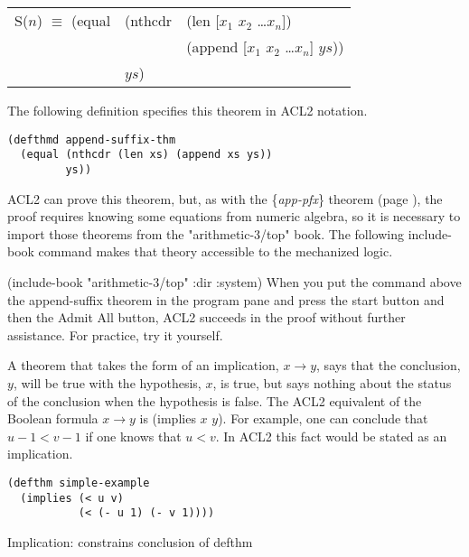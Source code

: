 \begin{samepage}
\begin{center}
\begin{tabular}{lll}
S($n$) $\equiv$ (equal & (nthcdr & (len [$x_1$ $x_2$ \dots $x_n$])          \\
                       &         & (append [$x_1$ $x_2$ \dots $x_n$] $ys$)) \\
                       & $ys$)   &                                          \\
\end{tabular}
\end{center}
\end{samepage}

The following definition specifies this theorem in ACL2 notation.

\begin{Verbatim}
(defthmd append-suffix-thm
  (equal (nthcdr (len xs) (append xs ys))
         ys))
\end{Verbatim}

ACL2 can prove this theorem, but,
as with the \{\emph{app-pfx}\} theorem (page \pageref{app-pfx-thm}),
the proof requires knowing some equations from numeric algebra,
so it is necessary to import those theorems from the
\label{arith-top-book}
"arithmetic-3/top" book.
The following include-book command makes that theory accessible to the mechanized logic.

(include-book "arithmetic-3/top" :dir :system)
\newline
When you put the command above the append-suffix theorem in the program pane
and press the start button and then the Admit All button,
ACL2 succeeds in the proof without further assistance. For practice, try it yourself.

\begin{aside}
A theorem that takes the form of an implication, $x \rightarrow y$,
says that the conclusion, $y$, will be true with the hypothesis, $x$,
is true, but says nothing about the status of the conclusion when
the hypothesis is false. The ACL2 equivalent of the Boolean formula $x \rightarrow y$
is (implies $x$ $y$).
For example, one can conclude that $u - 1 < v - 1$
if one knows that $u < v$.
In ACL2 this fact would be stated as an implication.
\begin{Verbatim}
(defthm simple-example
  (implies (< u v)
           (< (- u 1) (- v 1))))
\end{Verbatim}
\caption{Implication: constrains conclusion of defthm}
\label{implies-def}
\end{aside}



